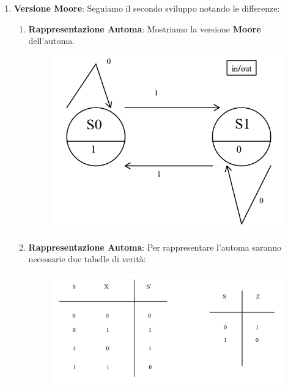 \documentclass{article}
\begin{document}
\begin{enumerate}
    \item \textbf{Versione Moore}: Seguiamo il secondo sviluppo notando le differenze:
    \begin{enumerate}
        \item \textbf{Rappresentazione Automa}: Mostriamo la versione \textbf{Moore} dell'automa.
            \begin{figure}[htbp]
                \includegraphics[scale=0.35]{img/paritaMoore.png}
                \centering
            \end{figure}
            \vspace*{10px}
            \item \textbf{Rappresentazione Automa}: Per rappresentare l'automa saranno necessarie due tabelle di verità:
            \begin{figure}[htbp]
                \includegraphics[scale=0.35]{img/paritaMooreTV.png}
                \centering
            \end{figure}
            \vspace*{10px}

\end{enumerate}
\end{enumerate}
\end{document}
